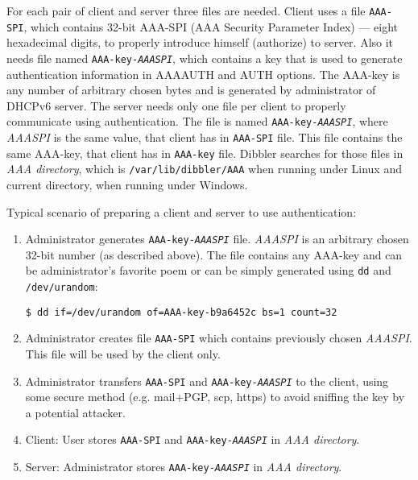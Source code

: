 For each pair of client and server three files are needed. Client uses
a file \texttt{AAA-SPI}, which contains 32-bit AAA-SPI (AAA Security
Parameter Index) --- eight hexadecimal digits, to properly introduce
himself (authorize) to server. Also it needs file named
\texttt{AAA-key-\textit{AAASPI}}, which contains a key that is used to
generate authentication information in AAAAUTH and AUTH options. The
AAA-key is any number of arbitrary chosen bytes and is generated by
administrator of DHCPv6 server. The server needs only one file per
client to properly communicate using authentication. The file is named
\texttt{AAA-key-\textit{AAASPI}}, where \textit{AAASPI} is the same
value, that client has in \texttt{AAA-SPI} file. This file contains
the same AAA-key, that client has in \texttt{AAA-key} file. Dibbler
searches for those files in \textit{AAA directory}, which is
\texttt{/var/lib/dibbler/AAA} when running under Linux and current
directory, when running under Windows.

Typical scenario of preparing a client and server to use authentication:
\begin{enumerate}
 \item Administrator generates \texttt{AAA-key-\textit{AAASPI}}
   file. \textit{AAASPI} is an arbitrary chosen 32-bit number (as
   described above). The file contains any AAA-key and can be
   administrator's favorite poem or can be simply generated using
   \texttt{dd} and \texttt{/dev/urandom}:
\begin{lstlisting}
$ dd if=/dev/urandom of=AAA-key-b9a6452c bs=1 count=32
\end{lstlisting}

\item Administrator creates file \texttt{AAA-SPI} which contains
  previously chosen \textit{AAASPI}. This file will be used by the
  client only.

\item Administrator transfers \texttt{AAA-SPI} and
  \texttt{AAA-key-\textit{AAASPI}} to the client, using some secure
  method (e.g. mail+PGP, scp, https) to avoid sniffing the key by a
  potential attacker.

\item Client: User stores \texttt{AAA-SPI} and
  \texttt{AAA-key-\textit{AAASPI}} in \textit{AAA directory}.

\item Server: Administrator stores \texttt{AAA-key-\textit{AAASPI}} in
  \textit{AAA directory}.

\end{enumerate}

